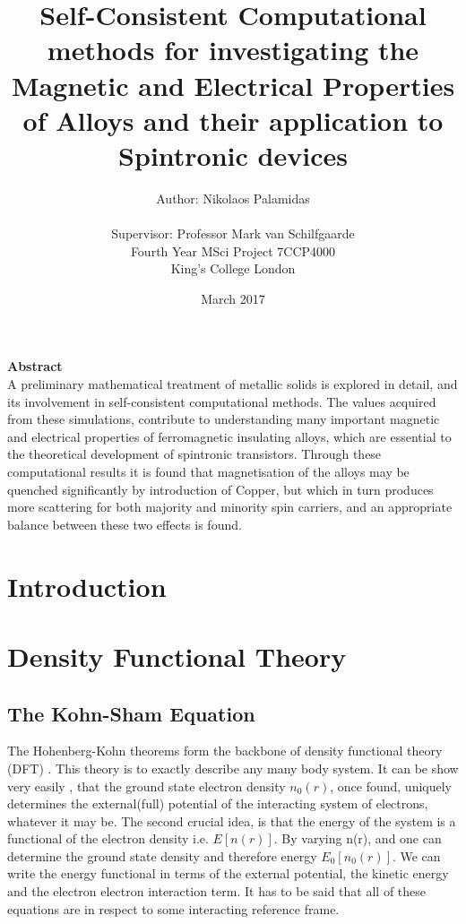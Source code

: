 \documentclass[12pt]{article}
\title{Self-Consistent Computational methods for investigating the Magnetic and Electrical Properties of Alloys and their application to Spintronic devices}
\author{Author: Nikolaos Palamidas \\\\ Supervisor: Professor Mark van Schilfgaarde\\Fourth Year MSci Project 7CCP4000 \\King's College London}
\date{March 2017}
\begin{document}
\maketitle
\clearpage
\thispagestyle{plain}
\begin{center}
    
    \vspace{0.9cm}
    \textbf{Abstract} 
   \\
   A preliminary mathematical treatment of metallic solids is explored in detail, and its involvement in self-consistent computational methods. The values acquired from these simulations, contribute to understanding many important magnetic and electrical properties of ferromagnetic insulating alloys, which are essential to the theoretical development of spintronic transistors. Through these computational results it is found that magnetisation of the alloys may be quenched significantly by introduction of Copper, but which in turn produces more scattering for both majority and minority spin carriers, and an appropriate balance between these two effects is found. 
\end{center}
\clearpage
\tableofcontents
\clearpage

\section{Introduction}
\section{Density Functional Theory}

\subsection{The Kohn-Sham Equation}
The Hohenberg-Kohn theorems form the backbone of density functional theory (DFT) \cite{inhom}. This theory is to exactly describe any many body system. It can be show very easily \cite{martin}, that the ground state electron density $n_0(r)$, once found, uniquely determines the external(full) potential of the interacting system of electrons, whatever it may be. The second crucial idea, is that the energy of the system is a functional of the electron density i.e. $E[n(r)]$. By varying n(r), and one can determine the ground state density and therefore energy $E_0[n_0(r)]$.
We can write the energy functional in terms of the external potential, the kinetic energy and the electron electron interaction term. It has to be said that all of these equations are in respect to some interacting reference frame.
\end{document}
